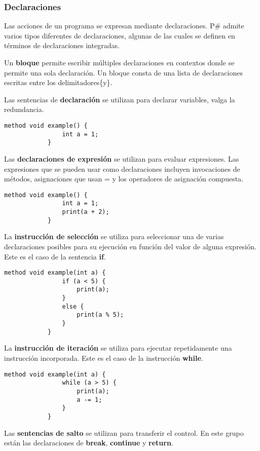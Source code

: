 	\subsubsection{Declaraciones}
		Las acciones de un programa se expresan mediante declaraciones. P\# admite varios tipos diferentes de declaraciones, algunas de las cuales se definen en términos de declaraciones integradas.
		
		Un \textbf{bloque} permite escribir múltiples declaraciones en contextos donde se permite una sola declaración. Un bloque consta de una lista de declaraciones escritas entre los delimitadores\{y\}.
		
		Las sentencias de \textbf{declaración} se utilizan para declarar variables, valga la redundancia.
		
		\begin{lstlisting}[language={PySharp}]
			method void example() {
				int a = 1;
			}
		\end{lstlisting}
	
		Las \textbf{declaraciones de expresión} se utilizan para evaluar expresiones. Las expresiones que se pueden usar como declaraciones incluyen invocaciones de métodos, asignaciones que usan = y los operadores de asignación compuesta.
		
		\begin{lstlisting}[language={PySharp}]
			method void example() {
				int a = 1;
				print(a + 2);
			}
		\end{lstlisting}
	
		La \textbf{instrucción de selección} se utiliza para seleccionar una de varias declaraciones posibles para su ejecución en función del valor de alguna expresión. Este es el caso de la sentencia \textbf{if}.
		
		\begin{lstlisting}[language={PySharp}]
			method void example(int a) {
				if (a < 5) {
					print(a);
				}
				else {
					print(a % 5);
				}
			}
		\end{lstlisting}
		
		La \textbf{instrucción de iteración} se utiliza para ejecutar repetidamente una instrucción incorporada. Este es el caso de la instrucción \textbf{while}.
		
		\begin{lstlisting}[language={PySharp}]
			method void example(int a) {
				while (a > 5) {
					print(a);
					a -= 1;
				}
			}
		\end{lstlisting}
		
		Las \textbf{sentencias de salto} se utilizan para transferir el control. En este grupo están las declaraciones de \textbf{break}, \textbf{continue} y \textbf{return}.
		
